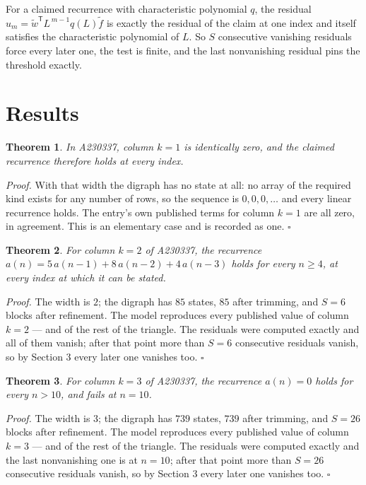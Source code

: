 \documentclass[11pt]{article}
\newtheorem{theorem}{Theorem}
\theoremstyle{definition}
\begin{document}
For a claimed recurrence with characteristic polynomial $q$, the residual $u_m = \tilde w^{\mathsf T}L^{\,m-1}q(L)\tilde f$ is exactly the residual of the claim at one index and itself satisfies the characteristic polynomial of $L$. So $S$ consecutive vanishing residuals force every later one, the test is finite, and the last nonvanishing residual pins the threshold exactly.

\section{Results}

\begin{theorem} In A230337, column $k = 1$ is identically zero, and the claimed recurrence therefore holds at every index.\end{theorem}

{\itshape Proof.} With that width the digraph has no state at all: no array of the required kind exists for any number of rows, so the sequence is $0,0,0,\dots$ and every linear recurrence holds. The entry's own published terms for column $k = 1$ are all zero, in agreement. This is an elementary case and is recorded as one. $\square$

\begin{theorem} For column $k = 2$ of A230337, the recurrence $a(n) = 5\,a(n-1) + 8\,a(n-2) + 4\,a(n-3)$ holds for every $n \ge 4$, at every index at which it can be stated.\end{theorem}

{\itshape Proof.} The width is $2$; the digraph has $85$ states, $85$ after trimming, and $S = 6$ blocks after refinement. The model reproduces every published value of column $k = 2$ --- and of the rest of the triangle. The residuals were computed exactly and all of them vanish; after that point more than $S = 6$ consecutive residuals vanish, so by Section 3 every later one vanishes too. $\square$

\begin{theorem} For column $k = 3$ of A230337, the recurrence $a(n) = 0$ holds for every $n > 10$, and fails at $n = 10$.\end{theorem}

{\itshape Proof.} The width is $3$; the digraph has $739$ states, $739$ after trimming, and $S = 26$ blocks after refinement. The model reproduces every published value of column $k = 3$ --- and of the rest of the triangle. The residuals were computed exactly and the last nonvanishing one is at $n = 10$; after that point more than $S = 26$ consecutive residuals vanish, so by Section 3 every later one vanishes too. $\square$
\end{document}

